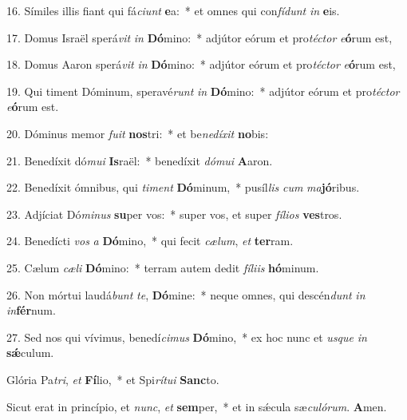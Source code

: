 \begin{latinenglishsection}
{	 16. Símiles illis fiant qui fá\textit{ci}\textit{unt} \textbf{e}a:~*
		et omnes qui con\textit{fí}\textit{dunt} \textit{in} \textbf{e}is.
	
	 17. Domus Israël sperá\textit{vit} \textit{in} \textbf{Dó}mi\-no:~*
		adjútor eórum et pro\textit{téc}\textit{tor} \textit{e}\textbf{ó}rum est,
	
	 18. Domus Aaron sperá\textit{vit} \textit{in} \textbf{Dó}mi\-no:~*
		adjútor eórum et pro\textit{téc}\textit{tor} \textit{e}\textbf{ó}rum est,
	
	 19. Qui timent Dóminum, speravé\textit{runt} \textit{in} \textbf{Dó}mino:~*
		adjútor eórum et pro\textit{téc}\textit{tor} \textit{e}\textbf{ó}rum est.
	
	 20. Dóminus memor \textit{fu}\textit{it} \textbf{nos}tri:~*
		et be\textit{ne}\textit{dí}\textit{xit} \textbf{no}bis:
	
	 21. Benedíxit dó\textit{mu}\textit{i} \textbf{Is}raël:~*
		benedíxit \textit{dó}\textit{mu}\textit{i} \textbf{A}aron.
	
	 22. Benedíxit ómnibus, qui \textit{ti}\textit{ment} \textbf{Dó}minum,~*
		pusíl\textit{lis} \textit{cum} \textit{ma}\textbf{jó}ribus.
	
	 23. Adjíciat Dó\textit{mi}\textit{nus} \textbf{su}per vos:~*
		super vos, et super \textit{fí}\textit{li}\textit{os} \textbf{ves}tros.
	
	 24. Benedícti \textit{vos} \textit{a} \textbf{Dó}mino,~*
		qui fecit \textit{cæ}\textit{lum}, \textit{et} \textbf{ter}ram.
	
	 25. Cælum \textit{cæ}\textit{li} \textbf{Dó}mino:~*
		terram autem dedit \textit{fí}\textit{li}\textit{is} \textbf{hó}minum.
	
	 26. Non mórtui laudá\textit{bunt} \textit{te}, \textbf{Dó}mine:~*
		neque omnes, qui descén\textit{dunt} \textit{in} \textit{in}\textbf{fér}num.
}{
	
}

\end{latinenglishsection}

 27. Sed nos qui vívimus, benedí\textit{ci}\textit{mus} \textbf{Dó}mino,~*
	ex hoc nunc et \textit{us}\textit{que} \textit{in} \textbf{s\'{\ae}}culum.

 Glória Pa\textit{tri}, \textit{et} \textbf{Fí}lio,~*
	et Spi\textit{rí}\textit{tu}\textit{i} \textbf{Sanc}to.

 Sicut erat in princípio, et \textit{nunc}, \textit{et} \textbf{sem}per,~*
	et in s\'{\ae}cula sæ\textit{cu}\textit{ló}\textit{rum}. \textbf{A}men.